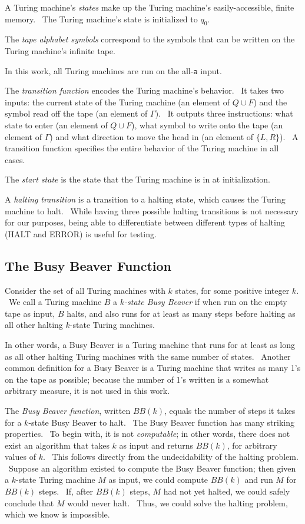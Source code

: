 \documentclass[11pt]{article}
\begin{document}
A Turing machine's \emph{states} make up the Turing machine's easily-accessible, finite memory. \ The Turing machine's state is initialized to $q_0$.

The \emph{tape alphabet symbols} correspond to the symbols that can be written on the Turing machine's infinite tape.

In this work, all Turing machines are run on the all-\texttt{a} input.

The \emph{transition function} encodes the Turing machine's behavior. \ It takes two inputs: the current state of the Turing machine (an element of $Q \cup F$) and the symbol read off the tape (an element of $\Gamma$). \ It outputs three instructions: what state to enter (an element of $Q \cup F$), what symbol to write onto the tape (an element of $\Gamma$) and what direction to move the head in (an element of $\{L, R\}$). \ A transition function specifies the entire behavior of the Turing machine in all cases.

The \emph{start state} is the state that the Turing machine is in at initialization.

A \emph{halting transition} is a transition to a halting state, which causes the Turing machine to halt. \ While having three possible halting transitions is not necessary for our purposes, being able to differentiate between different types of halting (HALT and ERROR) is useful for testing.

\subsection{The Busy Beaver Function}

Consider the set of all Turing machines with $k$ states, for some positive integer $k$. \ We call a Turing machine $B$ a $k$\emph{-state Busy Beaver} if when run on the empty tape as input, $B$ halts, and also runs for at least as many steps before halting as all other halting $k$-state Turing machines.~\cite{busybeaver}

In other words, a Busy Beaver is a Turing machine that runs for at least as long as all other halting Turing machines with the same number of states. \ Another common definition for a Busy Beaver is a Turing machine that writes as many 1's on the tape as possible; because the number of 1's written is a somewhat arbitrary measure, it is not used in this work.

The \emph{Busy Beaver function}, written $BB(k)$, equals the number of steps it takes for a $k$-state Busy Beaver to halt. \ The Busy Beaver function has many striking properties. \ To begin with, it is not \emph{computable}; in other words, there does not exist an algorithm that takes $k$ as input and returns $BB(k)$, for arbitrary values of $k$. \ This follows directly from the undecidability of the halting problem. \ Suppose an algorithm existed to compute the Busy Beaver function; then given a $k$-state Turing machine $M$ as input, we could compute $BB(k)$ and run $M$ for $BB(k)$ steps. \ If, after $BB(k)$ steps, $M$ had not yet halted, we could safely conclude that $M$ would never halt. \ Thus, we could solve the halting problem, which we know is impossible.
\end{document}
